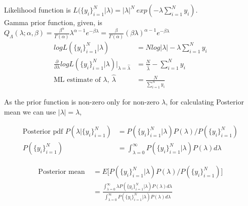 \documentclass[11pt, fleqn]{article}
\begin{document}
Likelihood function is $L(\{y_i\}_{i=1}^N|\lambda) = |\lambda|^N \  exp(-\lambda \sum_{i=1}^N y_i)$. \\
Gamma prior function, given, is $Q_\Lambda(\lambda;\alpha,\beta) = \frac{\beta^{\alpha}}{\Gamma(\alpha)} \lambda^{\alpha-1} e^{-\beta\lambda} = \frac{\beta}{\Gamma(\alpha)} (\beta\lambda)^{\alpha-1} e^{-\beta\lambda} $ \\
\begin{equation*}
    \begin{aligned}
        log L(\{y_i\}_{i=1}^N|\lambda) &= N log |\lambda| - \lambda \sum_{i=1}^N y_i \\
        \frac{\partial}{\partial \lambda} log L(\{y_i\}_{i=1}^N|\lambda) \bigg|_{\lambda = \hat{\lambda}} & = \frac{N}{\hat{\lambda}} - \sum_{i=1}^N y_i \\
        \text{ML estimate of $\lambda$},\ \hat{\lambda} &= \frac{N}{\sum_{i=1}^N y_i}  
    \end{aligned}
\end{equation*}

As the prior function is non-zero only for non-zero $\lambda$, for calculating Posterior mean we can use $|\lambda| = \lambda$,

\begin{equation*}
    \begin{aligned}
        \text{Posterior pdf } P(\lambda|\{y_i\}_{i=1}^N) &= P(\{y_i\}_{i=1}^N|\lambda) P(\lambda) / P(\{y_i\}_{i=1}^N) \\
        P(\{y_i\}_{i=1}^N) &= \int_{\lambda=0}^{\infty} P(\{y_i\}_{i=1}^N|\lambda) P(\lambda) d\lambda
    \end{aligned}
\end{equation*}

\begin{equation*}
    \begin{aligned}
        \text{Posterior mean } &= E \bigg[ P(\{y_i\}_{i=1}^N|\lambda) P(\lambda) / P(\{y_i\}_{i=1}^N) \bigg] \\
            &= \frac{\int_{\lambda=0}^{\infty} \lambda P(\{y_i\}_{i=1}^N|\lambda) P(\lambda) d\lambda}{\int_{\lambda=0}^{\infty} P(\{y_i\}_{i=1}^N|\lambda) P(\lambda) d\lambda}
    \end{aligned}
\end{equation*}
\end{document}

